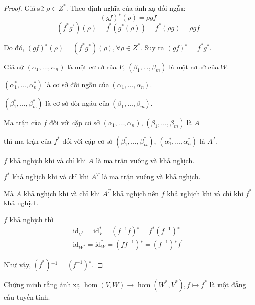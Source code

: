 \documentclass[class=nhvh-linear-algebra,crop=false]{standalone}
\begin{document}
\begin{proof}
    Giả sử $\rho\in Z^{*}$. Theo định nghĩa của ánh xạ đối ngẫu:
    \[
        (gf){}^{*}(\rho) = \rho gf
    \]
    \[
        (f^{*}g^{*})(\rho) = f^{*}(g^{*}(\rho)) = f^{*}(\rho g) = \rho gf
    \]
    \par Do đó, $(gf){}^{*}(\rho) = (f^{*}g^{*})(\rho), \forall\rho\in Z^{*}$. Suy ra $(gf){}^{*} = f^{*}g^{*}$.
    \bigskip
    \par Giả sử $(\alpha_{1}, \ldots, \alpha_{n})$ là một cơ sở của $V$, $(\beta_{1}, \ldots, \beta_{m})$ là một cơ sở của $W$.
    \par $(\alpha^{*}_{1}, \ldots, \alpha^{*}_{n})$ là cơ sở đối ngẫu của $(\alpha_{1}, \ldots, \alpha_{n})$.
    \par $(\beta^{*}_{1}, \ldots, \beta^{*}_{m})$ là cơ sở đối ngẫu của $(\beta_{1}, \ldots, \beta_{m})$.
    \par Ma trận của $f$ đối với cặp cơ sở $(\alpha_{1}, \ldots, \alpha_{n})$, $(\beta_{1}, \ldots, \beta_{m})$ là $A$
    \par thì ma trận của $f^{*}$ đối với cặp cơ sở $(\beta^{*}_{1}, \ldots, \beta^{*}_{m})$, $(\alpha^{*}_{1}, \ldots, \alpha^{*}_{n})$ là $A^{T}$.
    \par $f$ khả nghịch khi và chỉ khi $A$ là ma trận vuông và khả nghịch.
    \par $f^{*}$ khả nghịch khi và chỉ khi $A^{T}$ là ma trận vuông và khả nghịch.
    \par Mà $A$ khả nghịch khi và chỉ khi $A^{T}$ khả nghịch nên $f$ khả nghịch khi và chỉ khi $f^{*}$ khả nghịch.
    \bigskip
    \par $f$ khả nghịch thì
    \[
        \begin{split}
            \text{id}_{V^{*}} = \text{id}^{*}_{V} = (f^{-1}f){}^{*} = f^{*}(f^{-1}){}^{*} \\
            \text{id}_{W^{*}} = \text{id}^{*}_{W} = (ff^{-1}){}^{*} = (f^{-1}){}^{*}f^{*}
        \end{split}
    \]
    \par Như vậy, $(f^{*}){}^{-1} = (f^{-1}){}^{*}$.
\end{proof}

\begin{exercise}
    Chứng minh rằng ánh xạ $\hom(V, W)\to\hom(W^{*}, V^{*}), f\mapsto f^{*}$ là một đẳng cấu tuyến tính.
\end{exercise}
\end{document}
